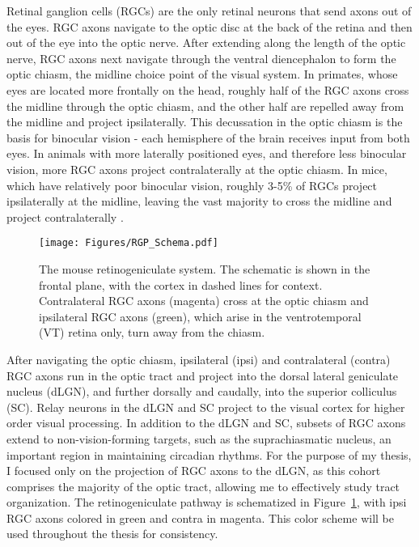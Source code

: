 Retinal ganglion cells (RGCs) are the only retinal neurons that send axons out of the eyes.
RGC axons navigate to the optic disc at the back of the retina and then out of the eye into the optic nerve.
After extending along the length of the optic nerve, RGC axons next navigate through the ventral diencephalon to form the optic chiasm, the midline choice point of the visual system.
In primates, whose eyes are located more frontally on the head, roughly half of the RGC axons cross the midline through the optic chiasm, and the other half are repelled away from the midline and project ipsilaterally.
This decussation in the optic chiasm is the basis for binocular vision - each hemisphere of the brain receives input from both eyes.
In animals with more laterally positioned eyes, and therefore less binocular vision, more RGC axons project contralaterally at the optic chiasm.
In mice, which have relatively poor binocular vision, roughly 3-5\% of RGCs project ipsilaterally at the midline, leaving the vast majority to cross the midline and project contralaterally \cite{petros2008retinal}.

\begin{figure}[hbtp]
    \begin{center}
        \texttt{[image: Figures/RGP\_Schema.pdf]}
        \caption[The mouse retinogeniculate system.]
        {The mouse retinogeniculate system.
        The schematic is shown in the frontal plane, with the cortex in dashed lines for context.
        Contralateral RGC axons (magenta) cross at the optic chiasm and ipsilateral RGC axons (green), which arise in the ventrotemporal (VT) retina only, turn away from the chiasm.}
        \label{Figures/RGPSchema}
    \end{center}
\end{figure}
After navigating the optic chiasm, ipsilateral (ipsi) and contralateral (contra) RGC axons run in the optic tract and project into the dorsal lateral geniculate nucleus (dLGN), and further dorsally and caudally, into the superior colliculus (SC).
Relay neurons in the dLGN and SC project to the visual cortex for higher order visual processing.
In addition to the dLGN and SC, subsets of RGC axons extend to non-vision-forming targets, such as the suprachiasmatic nucleus, an important region in maintaining circadian rhythms.
For the purpose of my thesis, I focused only on the projection of RGC axons to the dLGN, as this cohort comprises the majority of the optic tract, allowing me to effectively study tract organization.
The retinogeniculate pathway is schematized in Figure~\ref{Figures/RGPSchema}, with ipsi RGC axons colored in green and contra in magenta.
This color scheme will be used throughout the thesis for consistency.

